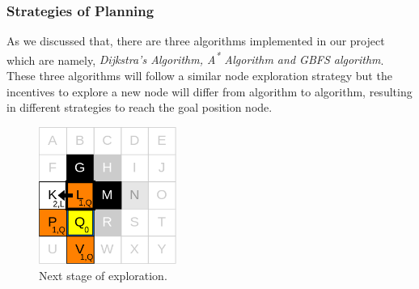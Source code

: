 \subsubsection{Strategies of Planning}
As we discussed that, there are three algorithms implemented in our project which are namely, \textit{Dijkstra's Algorithm, A\textsuperscript{*} Algorithm and GBFS algorithm}.
These three algorithms will follow a similar node exploration strategy but the incentives to explore a new node will differ from algorithm to algorithm, resulting in different strategies to reach the goal position node.

\begin{figure}[th]
    \centering
    \includegraphics[width=0.4\textwidth]{Figures/grid_map_expansion_03.png}
    \decoRule
    \caption[]{Next stage of exploration.}
    \label{fig:NextNodeExploration4Node}
\end{figure}






